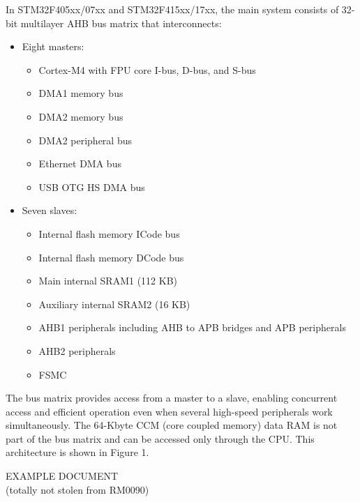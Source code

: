 In STM32F405xx/07xx and STM32F415xx/17xx, the main system consists of 32-bit 
multilayer AHB bus matrix that interconnects:
\begin{itemize}
    \item Eight masters:
    \begin{itemize}
        \item Cortex\textsuperscript{\textregistered}-M4 with FPU core I-bus, D-bus, and S-bus
        \item DMA1 memory bus
        \item DMA2 memory bus
        \item DMA2 peripheral bus
        \item Ethernet DMA bus
        \item USB OTG HS DMA bus
    \end{itemize}
    \item Seven slaves:
    \begin{itemize}
        \item Internal flash memory ICode bus
        \item Internal flash memory DCode bus
        \item Main internal SRAM1 (112 KB)
        \item Auxiliary internal SRAM2 (16 KB)
        \item AHB1 peripherals including AHB to APB bridges and APB peripherals
        \item AHB2 peripherals
        \item FSMC
    \end{itemize}
\end{itemize}

\noindent The bus matrix provides access from a master to a slave, enabling concurrent access and 
efficient operation even when several high-speed peripherals work simultaneously. 
The 64-Kbyte CCM (core coupled memory) data RAM is not part of the bus matrix and can be 
accessed only through the CPU. This architecture is shown in Figure 1.

\vfill{}
\begin{center}
EXAMPLE DOCUMENT \\ \small (totally not stolen from RM0090)
\end{center}
\vfill{}

